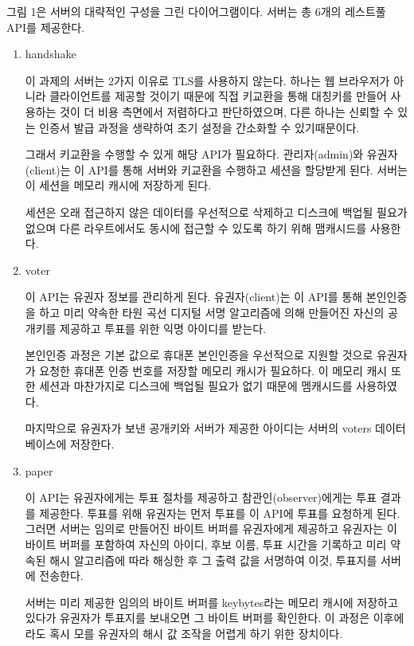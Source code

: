 \documentclass[10pt,a4paper,left=15mm,right=15mm,top=20mm,bottom=20mm]{article}
\begin{document}
그림 1은 서버의 대략적인 구성을 그린 다이어그램이다. 서버는 총 6개의 레스트풀 API를 제공한다.

\begin{enumerate}
    \item handshake
    
    이 과제의 서버는 2가지 이유로 TLS를 사용하지 않는다. 하나는 웹 브라우저가 아니라 클라이언트를 제공할 것이기 때문에 직접 키교환을 통해 대칭키를 만들어 사용하는 것이 더 비용 측면에서 저렴하다고 판단하였으며, 다른 하나는 신뢰할 수 있는 인증서 발급 과정을 생략하여 초기 설정을 간소화할 수 있기때문이다.

    그래서 키교환을 수행할 수 있게 해당 API가 필요하다. 관리자(admin)와 유권자(client)는 이 API를 통해 서버와 키교환을 수행하고 세션을 할당받게 된다. 서버는 이 세션을 메모리 캐시에 저장하게 된다.
    
    세션은 오래 접근하지 않은 데이터를 우선적으로 삭제하고 디스크에 백업될 필요가 없으며 다른 라우트에서도 동시에 접근할 수 있도록 하기 위해 맴캐시드를 사용한다.

    \item voter
    
    이 API는 유권자 정보를 관리하게 된다. 유권자(client)는 이 API를 통해 본인인증을 하고 미리 약속한 타원 곡선 디지털 서명 알고리즘에 의해 만들어진 자신의 공개키를 제공하고 투표를 위한 익명 아이디를 받는다.

    본인인증 과정은 기본 값으로 휴대폰 본인인증을 우선적으로 지원할 것으로 유권자가 요청한 휴대폰 인증 번호를 저장할 메모리 캐시가 필요하다. 이 메모리 캐시 또한 세션과 마찬가지로 디스크에 백업될 필요가 없기 때문에 멤캐시드를 사용하였다.

    마지막으로 유권자가 보낸 공개키와 서버가 제공한 아이디는 서버의 voters 데이터베이스에 저장한다.

    \item paper
    
    이 API는 유권자에게는 투표 절차를 제공하고 참관인(observer)에게는 투표 결과를 제공한다. 투표를 위해 유권자는 먼저 투표를 이 API에 투표를 요청하게 된다. 그러면 서버는 임의로 만들어진 바이트 버퍼를 유권자에게 제공하고 유권자는 이 바이트 버퍼를 포함하여 자신의 아이디, 후보 이름, 투표 시간을 기록하고 미리 약속된 해시 알고리즘에 따라 해싱한 후 그 출력 값을 서명하여 이것, 투표지를 서버에 전송한다.

    서버는 미리 제공한 임의의 바이트 버퍼를 keybytes라는 메모리 캐시에 저장하고 있다가 유권자가 투표지를 보내오면 그 바이트 버퍼를 확인한다. 이 과정은 이후에라도 혹시 모를 유권자의 해시 값 조작을 어렵게 하기 위한 장치이다.


\end{enumerate}
\end{document}
